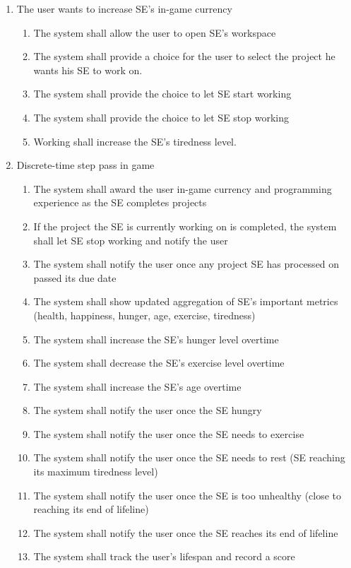 \documentclass[]{article}
\begin{document}
\begin{enumerate}[start=1, label={\textbf{BE\arabic*.}}]
    \item The user wants to increase SE’s in-game currency
	\begin{enumerate}[1.]
		\item The system shall allow the user to open SE’s workspace
        \item The system shall provide a choice for the user to select the 
        project he wants his SE to work on.
        \item The system shall provide the choice to let SE start working
        \item The system shall provide the choice to let SE stop working
        \item Working shall increase the SE’s tiredness level.
    \end{enumerate}
    
    \item Discrete-time step pass in game
	\begin{enumerate}[1.]
        \item The system shall award the user in-game currency and programming 
        experience as the SE completes projects
        \item If the project the SE is currently working on is completed, the 
        system shall let SE stop working and notify the user
        \item The system shall notify the user once any project SE has processed 
        on passed its due date
        \item The system shall show updated aggregation of SE’s important 
        metrics (health, happiness, hunger, age, exercise, tiredness)
        \item The system shall increase the SE’s hunger level overtime
        \item The system shall decrease the SE’s exercise level overtime
        \item The system shall increase the SE’s age overtime
        \item The system shall notify the user once the SE hungry
        \item The system shall notify the user once the SE needs to exercise
        \item The system shall notify the user once the SE needs to rest (SE 
        reaching its maximum tiredness level)
        \item The system shall notify the user once the SE is too unhealthy 
        (close to reaching its end of lifeline)
        \item The system shall notify the user once the SE reaches its end of 
        lifeline
        \item The system shall track the user’s lifespan and record a score
    \end{enumerate}
    

\end{enumerate}
\end{document}
